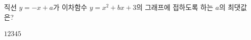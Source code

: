 직선 $y=-x+a$가 이차함수 $y=x^2+bx+3$의 그래프에 접하도록 하는 $a$의 최댓값은? 
\begin{choices32}{$1$}{$2$}{$3$}{$4$}{$5$}\end{choices32}

